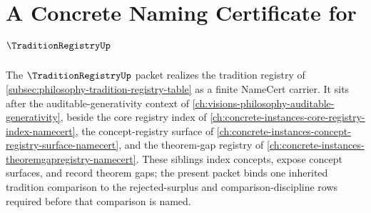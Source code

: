 \chapter{A Concrete Naming Certificate for $\TraditionRegistryUp$}
\label{ch:concrete-instances-tradition-registry-namecert}

The $\TraditionRegistryUp$ packet realizes the tradition registry of \autoref{subsec:philosophy-tradition-registry-table} as a finite NameCert carrier. It sits after the auditable-generativity context of \autoref{ch:visions-philosophy-auditable-generativity}, beside the core registry index of \autoref{ch:concrete-instances-core-registry-index-namecert}, the concept-registry surface of \autoref{ch:concrete-instances-concept-registry-surface-namecert}, and the theorem-gap registry of \autoref{ch:concrete-instances-theoremgapregistry-namecert}. These siblings index concepts, expose concept surfaces, and record theorem gaps; the present packet binds one inherited tradition comparison to the rejected-surplus and comparison-discipline rows required before that comparison is named.

